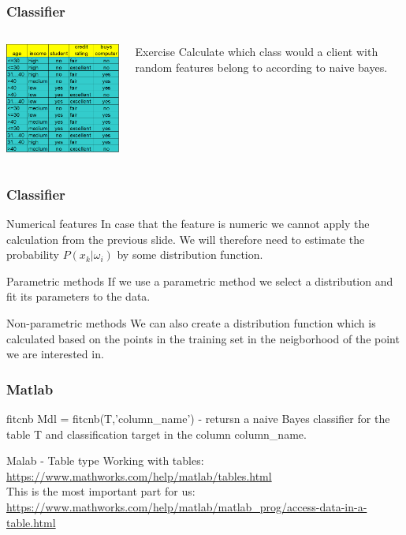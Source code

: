 \documentclass{beamer}
\begin{document}
\begin{frame}
\frametitle{Classifier}
\begin{columns}[onlytextwidth,T]


  \column{70mm}
  \includegraphics[width=70mm]{table.png}
  
  \column{30mm}
  \begin{block}{Exercise}
  Calculate which class would a client with random features belong to according to naive bayes.
  \end{block}
\end{columns}

\end{frame}


\begin{frame}
\frametitle{Classifier}
\begin{block}{Numerical features}
In case that the feature is numeric we cannot apply the calculation from the previous slide. We will therefore need to estimate the probability $P(x_k | \omega_i)$ by some distribution function.
\end{block}

\begin{block}{Parametric methods}
If we use a parametric method we select a distribution and fit its parameters to the data.
\end{block}

\begin{block}{Non-parametric methods}
We can also create a distribution function which is calculated based on the points in the training set in the neigborhood of the point we are interested in.
\end{block}
\end{frame}

\begin{frame}[fragile]
\frametitle{Matlab}
\begin{block}{fitcnb}
Mdl = fitcnb(T,'column\_name') - retursn a naive Bayes classifier for the table T and classification target in the column column\_name.
\end{block}

\begin{block}{Malab - Table type}
Working with tables: \\
\url{https://www.mathworks.com/help/matlab/tables.html}\\
\vspace{1em}
This is the most important part for us:
\url{https://www.mathworks.com/help/matlab/matlab_prog/access-data-in-a-table.html}
\end{block}
\end{frame}
\end{document}
